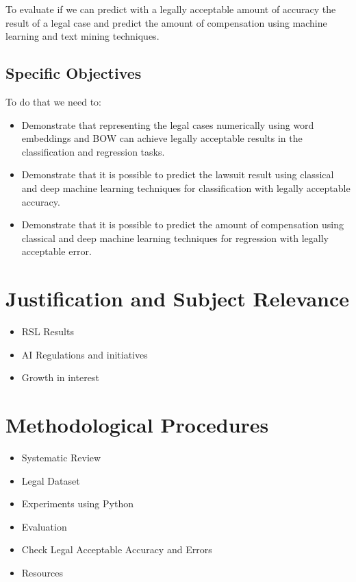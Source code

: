 To evaluate if we can predict with a legally acceptable amount of accuracy the result of a legal case and predict the amount of compensation using machine learning and text mining techniques.

\subsection{Specific Objectives}

To do that we need to:

\begin{itemize}[noitemsep]
    \item Demonstrate that representing the legal cases numerically using word embeddings and BOW can achieve legally acceptable results in the classification and regression tasks.
    \item Demonstrate that it is possible to predict the lawsuit result using classical and deep machine learning techniques for classification with legally acceptable accuracy.
    \item Demonstrate that it is possible to predict the amount of compensation  using classical and deep machine learning  techniques for regression with legally acceptable error.
\end{itemize}

\section{Justification and Subject Relevance}
\begin{itemize}[noitemsep]
    \item RSL Results
    \item AI Regulations and initiatives
    \item Growth in interest 
\end{itemize}

\section{Methodological Procedures}

\begin{itemize}[noitemsep]
    \item Systematic Review
    \item Legal Dataset 
    \item Experiments using Python
    \item Evaluation
    \item Check Legal Acceptable Accuracy and Errors
    \item Resources
\end{itemize}

